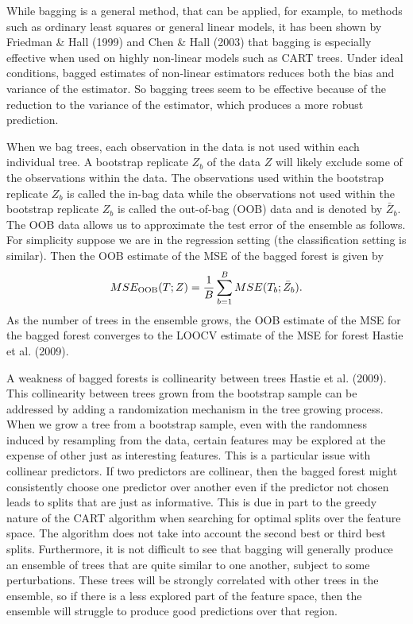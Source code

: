 \documentclass[12pt,twoside]{reedthesis}
\theoremstyle{definition}
\theoremstyle{definition}
\theoremstyle{definition}
\theoremstyle{remark}
\begin{document}
While bagging is a general method, that can be applied, for example, to
methods such as ordinary least squares or general linear models, it has
been shown by Friedman \& Hall (1999) and Chen \& Hall (2003) that
bagging is especially effective when used on highly non-linear models
such as CART trees. Under ideal conditions, bagged estimates of
non-linear estimators reduces both the bias and variance of the
estimator. So bagging trees seem to be effective because of the
reduction to the variance of the estimator, which produces a more robust
prediction. \par

When we bag trees, each observation in the data is not used within each
individual tree. A bootstrap replicate \(Z_b\) of the data \(Z\) will
likely exclude some of the observations within the data. The
observations used within the bootstrap replicate \(Z_b\) is called the
in-bag data while the observations not used within the bootstrap
replicate \(Z_b\) is called the out-of-bag (OOB) data and is denoted by
\(\bar{Z}_b\). The OOB data allows us to approximate the test error of
the ensemble as follows. For simplicity suppose we are in the regression
setting (the classification setting is similar). Then the OOB estimate
of the MSE of the bagged forest is given by
\[MSE_{\textup{OOB}}(T;Z)=\frac{1}{B}\sum_{b=1}^B MSE(T_b;\bar{Z}_b).\]
As the number of trees in the ensemble grows, the OOB estimate of the
MSE for the bagged forest converges to the LOOCV estimate of the MSE for
forest Hastie et al. (2009). \par

A weakness of bagged forests is collinearity between trees Hastie et al.
(2009). This collinearity between trees grown from the bootstrap sample
can be addressed by adding a randomization mechanism in the tree growing
process. When we grow a tree from a bootstrap sample, even with the
randomness induced by resampling from the data, certain features may be
explored at the expense of other just as interesting features. This is a
particular issue with collinear predictors. If two predictors are
collinear, then the bagged forest might consistently choose one
predictor over another even if the predictor not chosen leads to splits
that are just as informative. This is due in part to the greedy nature
of the CART algorithm when searching for optimal splits over the feature
space. The algorithm does not take into account the second best or third
best splits. Furthermore, it is not difficult to see that bagging will
generally produce an ensemble of trees that are quite similar to one
another, subject to some perturbations. These trees will be strongly
correlated with other trees in the ensemble, so if there is a less
explored part of the feature space, then the ensemble will struggle to
produce good predictions over that region. \par
\end{document}
